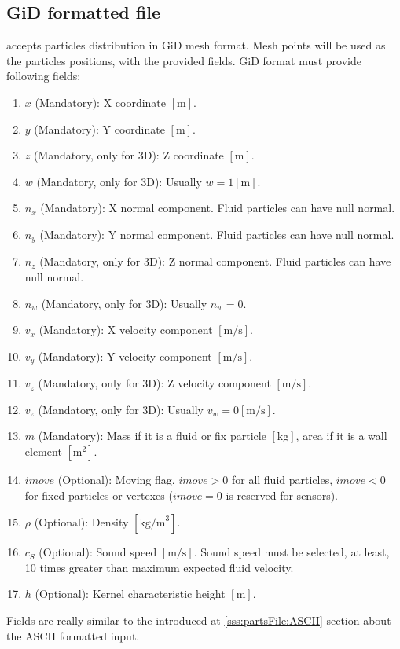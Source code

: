 \subsection{GiD formatted file}
\label{sss:partsFile:GiD}
%
\NAME accepts particles distribution in GiD mesh format. Mesh
points will be used as the particles positions, with the
provided fields. GiD format must provide following fields:
%
\begin{enumerate}
	\item \textbf{$x$} (Mandatory): X coordinate $[\mbox{m}]$.
	\item \textbf{$y$} (Mandatory): Y coordinate $[\mbox{m}]$.
	\item \textbf{$z$} (Mandatory, only for 3D): Z coordinate $[\mbox{m}]$.
	\item \textbf{$w$} (Mandatory, only for 3D): Usually $w=1 [\mbox{m}]$.
	\item \textbf{$n_x$} (Mandatory): X normal component. Fluid particles can have null normal.
	\item \textbf{$n_y$} (Mandatory): Y normal component. Fluid particles can have null normal.
	\item \textbf{$n_z$} (Mandatory, only for 3D): Z normal component. Fluid particles can have null normal.
	\item \textbf{$n_w$} (Mandatory, only for 3D): Usually $n_w=0$.
	\item \textbf{$v_x$} (Mandatory): X velocity component $[\mbox{m/s}]$.
	\item \textbf{$v_y$} (Mandatory): Y velocity component $[\mbox{m/s}]$.
	\item \textbf{$v_z$} (Mandatory, only for 3D): Z velocity component $[\mbox{m/s}]$.
	\item \textbf{$v_z$} (Mandatory, only for 3D): Usually $v_w=0 [\mbox{m/s}]$.
	\item \textbf{$m$} (Mandatory): Mass if it is a fluid or fix particle $[\mbox{kg}]$, area if it is a wall element $[\mbox{m}^2]$.
	\item \textbf{$imove$} (Optional): Moving flag. $imove > 0$ for all fluid particles, $imove < 0$ for fixed
	particles or vertexes ($imove = 0$ is reserved for sensors).
	\item \textbf{$\rho$} (Optional): Density $[\mbox{kg/m}^3]$.
	\item \textbf{$c_S$} (Optional): Sound speed $[\mbox{m/s}]$. Sound speed must be selected, at least, 10
	times greater than maximum expected fluid velocity.
	\item \textbf{$h$} (Optional): Kernel characteristic height $[\mbox{m}]$.
\end{enumerate}
%
Fields are really similar to the introduced at \ref{sss:partsFile:ASCII} section about the ASCII formatted input.
%